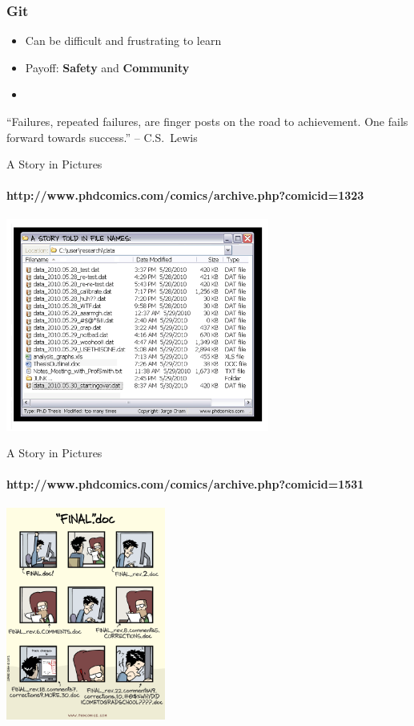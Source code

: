   \begin{frame}[t]
    \frametitle{Git}
    \begin{itemize}
      \item Can be difficult and frustrating to learn
      \item Payoff: {\bf Safety} and {\bf Community}
      \item 
    \end{itemize}
    ``Failures, repeated failures, are finger posts on the road to achievement.
    One fails forward towards success.'' -- C.S.\ Lewis
  \end{frame}

  \begin{frame}[t]{A Story in Pictures}
    \framesubtitle{http://www.phdcomics.com/comics/archive.php?comicid=1323} 
    \begin{center}
      \includegraphics[height=2.75in]{../images/phd052810s.png} 
    \end{center}
  \end{frame}

  \begin{frame}[t]{A Story in Pictures}
    \framesubtitle{http://www.phdcomics.com/comics/archive.php?comicid=1531} 
    \begin{center}
      \includegraphics[height=2.75in]{../images/phd101212s.png} 
    \end{center}
  \end{frame}

